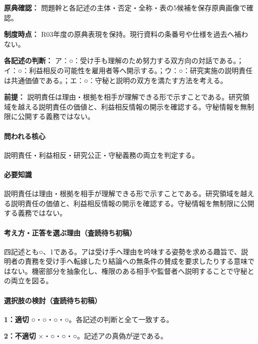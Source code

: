 \noindent\textbf{原典確認：} 問題幹と各記述の主体・否定・全称・表の5候補を保存原典画像で確認。\par

\noindent\textbf{制度時点：} R03年度の原典表現を保持。現行資料の条番号や仕様を過去へ補わない。\par

\noindent\textbf{各記述の判断：} ア：○：受け手も理解のため努力する双方向の対話である。；イ：○：利益相反の可能性を雇用者等へ開示する。；ウ：○：研究実施の説明責任は共通価値である。；エ：○：守秘と説明の双方を満たす方法を考える。\par

\noindent\textbf{前提：} 説明責任は理由・根拠を相手が理解できる形で示すことである。研究領域を越える説明責任の価値と、利益相反情報の開示を確認する。守秘情報を無制限に公開する義務ではない。\par

\paragraph{問われる核心} 説明責任・利益相反・研究公正・守秘義務の両立を判定する。

\paragraph{必要知識} 説明責任は理由・根拠を相手が理解できる形で示すことである。研究領域を越える説明責任の価値と、利益相反情報の開示を確認する。守秘情報を無制限に公開する義務ではない。

\paragraph{考え方・正答を選ぶ理由（査読待ち初稿）} 四記述とも○、1である。アは受け手へ理由を吟味する姿勢を求める趣旨で、説明者の責務を受け手へ転嫁したり結論への無条件の賛成を要求したりする意味ではない。機密部分を抽象化し、権限のある相手や監督者へ説明することで守秘との両立を図る。

\paragraph{選択肢の検討（査読待ち初稿）}\mbox{}\par

\noindent\textbf{1：適切} ○・○・○・○。各記述の判断と全て一致する。\par

\noindent\textbf{2：不適切} ×・○・○・○。記述アの真偽が逆である。\par

